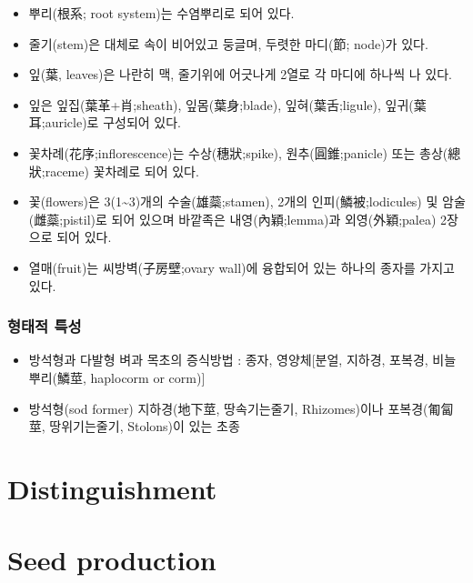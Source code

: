 \documentclass[]{book}
\providecommand{\tightlist}{%
  \setlength{\itemsep}{0pt}\setlength{\parskip}{0pt}}
\begin{document}
\begin{itemize}
\tightlist
\item
  뿌리(根系; root system)는 수염뿌리로 되어 있다.
\item
  줄기(stem)은 대체로 속이 비어있고 둥글며, 두렷한 마디(節; node)가
  있다.
\item
  잎(葉, leaves)은 나란히 맥, 줄기위에 어긋나게 2열로 각 마디에 하나씩
  나 있다.
\item
  잎은 잎집(葉革+肖;sheath), 잎몸(葉身;blade), 잎혀(葉舌;ligule),
  잎귀(葉耳;auricle)로 구성되어 있다.
\item
  꽃차례(花序;inflorescence)는 수상(穗狀;spike), 원추(圓錐;panicle) 또는
  총상(總狀;raceme) 꽃차례로 되어 있다.
\item
  꽃(flowers)은 3(1\textasciitilde{}3)개의 수술(雄蘂;stamen), 2개의
  인피(鱗被;lodicules) 및 암술(雌蘂;pistil)로 되어 있으며 바깥족은
  내영(內穎;lemma)과 외영(外穎;palea) 2장으로 되어 있다.
\item
  열매(fruit)는 씨방벽(子房壁;ovary wall)에 융합되어 있는 하나의 종자를
  가지고 있다.
\end{itemize}

\subsection{형태적 특성}\label{-}

\begin{itemize}
\tightlist
\item
  방석형과 다발형 벼과 목초의 증식방법 : 종자, 영양체{[}분얼, 지하경,
  포복경, 비늘뿌리(鱗莖, haplocorm or corm){]}
\item
  방석형(sod former) 지하경(地下莖, 땅속기는줄기, Rhizomes)이나
  포복경(匍匐莖, 땅위기는줄기, Stolons)이 있는 초종
\end{itemize}

\chapter{Distinguishment}\label{distinguishment}

\chapter{Seed production}\label{seed-production}


\end{document}
